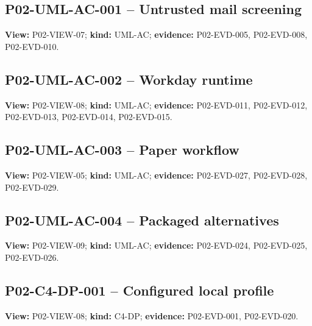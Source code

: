 \documentclass[10pt,letterpaper]{article}
\begin{document}
\subsection{P02-UML-AC-001 -- Untrusted mail screening}
\textbf{View:} P02-VIEW-07; \textbf{kind:} UML-AC; \textbf{evidence:} P02-EVD-005, P02-EVD-008, P02-EVD-010.\par
{}
\clearpage

\subsection{P02-UML-AC-002 -- Workday runtime}
\textbf{View:} P02-VIEW-08; \textbf{kind:} UML-AC; \textbf{evidence:} P02-EVD-011, P02-EVD-012, P02-EVD-013, P02-EVD-014, P02-EVD-015.\par
{}
\clearpage

\subsection{P02-UML-AC-003 -- Paper workflow}
\textbf{View:} P02-VIEW-05; \textbf{kind:} UML-AC; \textbf{evidence:} P02-EVD-027, P02-EVD-028, P02-EVD-029.\par
{}
\clearpage

\subsection{P02-UML-AC-004 -- Packaged alternatives}
\textbf{View:} P02-VIEW-09; \textbf{kind:} UML-AC; \textbf{evidence:} P02-EVD-024, P02-EVD-025, P02-EVD-026.\par
{}
\clearpage

\subsection{P02-C4-DP-001 -- Configured local profile}
\textbf{View:} P02-VIEW-08; \textbf{kind:} C4-DP; \textbf{evidence:} P02-EVD-001, P02-EVD-020.\par
{}

\clearpage
\end{document}
